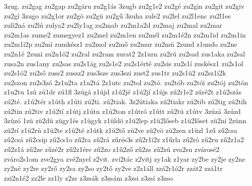 {3zug.
zu2gag
zu2gap
zu2gáru
zu2g1ás
3zugb
zu2g1e2
zu2gé
zu2gin
zu2git
zu2giv
zu2gí
3zugo
zu2g1or
zu2gö
zu2gü
zu2gű
3zuha
zule2
zu2lel
zu2l1enc
zu2l1es
zuli2ná
zu2lú
zulya2
zu2ly1ag
zu2mab
zu2m1a2d
zu2maj
zu2mal
zu2mar
zu2m1as
zume2
zumegyez1
zu2mel
zu2m1en
zu2mél
zu2m1é2n
zu2m1id
zu2m1in
zu2m1i2p
zu2mí
zumkész1
zu2mol
zu2mő
zu2mur
zu2mü
2zund
z1undo
zu2ne
zu2n1é
2zuni
zu2n1ö2
zu2ral
zu2ram
zurat2
2z1urn
zu2rú
zu2sad
zus1aka
zu2sal
zusa2n
zus1any
zu2sas
zu2s1ág
zu2s1e2
zu2s1érté
zu2sis
zu2s1í
zuskész1
zu2s1ol
zu2s1ó2
zu2ső
zuss2
zussz2
zus3sze
zus3szi
zust2
zus1tr
zu2s1ü2
zu2sz1i2k
zu2szon
zu2s3zó
2z1u2ta
z1u2tá
2z1utc
zu2tol
zu2tó.
zu2tób
zu2tói
zu2tój
zu2tón
z1u2tu
1zú
zú1dr
zú1fl
3zúgá
z1újd
z1ú2jé
z1ú2jí
z1újs
zú2r1e2
zúré2t
z1ú2szás
zú2té.
z1ú2tér
z1úth
z1úti
zú2ti.
zú2tiak.
3z2útiaka
zú2tiakr
zú2tib
zú2tig
zú2tih
zú2tin
zú2tiv
z1ú2tí
z1útj
z1útn
z1ú2ton
z1útró
z1útt
zú2tü
z1útv
3zúzá
3zúzd
3zúzó
1zü
zü2dü
zügy1és
z1ügyk
z1üldö
z1ü2lep
z1ü2lőseb
z1ü2lőset
zü2ni
2zünn
zü2rí
z1ü2rü
z1ü2te
z1ü2té
z1ütk
z1ü2tő
zü2ve
zü2vö
zü2zen
z1üzl
1zű
zű2csa
zű2csá
zű2csip
zű2cs1o
zű2ra
zű2rá
zűrés3s
zű2r1i2z
z1űrla
zű2ró
zű2ru
zű2z1a2
zű2z1á
zű2ze
zűzé2r
zű2z1ére
zű2zo
z1ű2ző
zű2zs
zű2zú
zva2su
zvárosé2
zváro2s1om
zve2gya
zvé2nyel
z2vit.
zvi2tác
z2vitj
zy1ak
z1yar
zy2be
zy2je
zy2ne
zy2né
zy2re
zy2rő
zy2sa
zy2so
zy2tő
zy2ve
z2z1áll
zzá2r1ó2r
zzát2
zzá1tr
zzi2n1é2
zz2le
zz1ly
z2zs
z3zsák
z3zsám
z3zsi
z3zsí
z3zso
}

